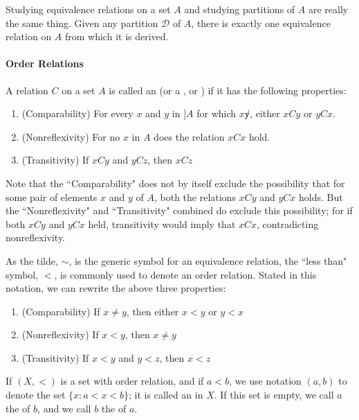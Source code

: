 Studying equivalence relations on a set $A$ and studying partitions of $A$ are really the same thing. Given any partition $\mathcal{D}$ of $A$, there is exactly one equivalence relation on $A$ from which it is derived.

\paragraph{Order Relations}

A relation $C$ on a set $A$ is called an \textbf{} (or a , or ) if it has the following properties:
\begin{enumerate}[itemsep=0pt]
    \item (Comparability) For every $x$ and $y$ in $]A$ for which $x \not y$, either $xCy$ or $yCx$.
    \item (Nonreflexivity) For no $x$ in $A$ does the relation $xCx$ hold.
    \item (Transitivity) If $xCy$ and $yCz$, then $xCz$
\end{enumerate}

Note that the ``Comparability" does not by itself exclude the possibility that for some pair of elements $x$ and $y$ of $A$, both the relations $xCy$ and $yCx$ holds. But the ``Nonreflexivity" and ``Transitivity" combined do exclude this possibility; for if both $xCy$ and $yCx$ held, transitivity would imply that $xCx$, contradicting nonreflexivity.

As the tilde, $\sim$, is the generic symbol for an equivalence relation, the ``less than" symbol, $<$, is commonly used to denote an order relation. Stated in this notation, we can rewrite the above three properties:
\begin{enumerate}[itemsep=0pt]
    \item (Comparability) If $x \neq y$, then either $x < y$ or $y < x$
    \item (Nonreflexivity) If $x < y$, then $x \neq y$
    \item (Transitivity) If $x < y$ and $y < z$, then $x < z$
\end{enumerate}

\begin{definition}
If $(X, <)$ is a set with order relation, and if $a < b$, we use notation $(a, b)$ to denote the set $\{x: a < x < b\}$; it is called an \textbf{} in $X$. If this set is empty, we call $a$ the \textbf{} of $b$, and we call $b$ the \textbf{} of $a$.
\end{definition}

